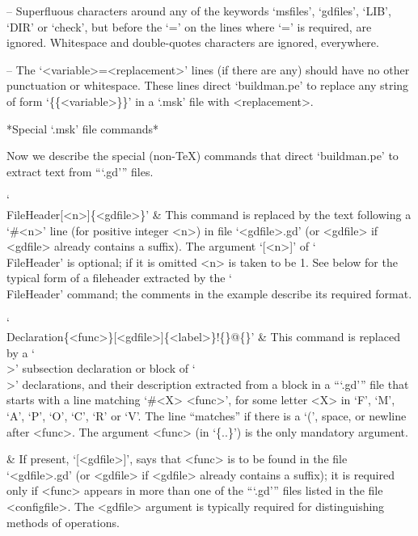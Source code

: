 \item{--}
Superfluous characters around any of the keywords  `msfiles',  `gdfiles',
`LIB', `DIR' or `check', but before the `=' on the  lines  where  `='  is
required,  are  ignored.  Whitespace  and  double-quotes  characters  are
ignored, everywhere.

\item{--}
The `<variable>=<replacement>' lines (if there are any)  should  have  no
other punctuation or whitespace.  These  lines  direct  `buildman.pe'  to
replace any string of form `\{\{<variable>\}\}' in  a  `.msk'  file  with
<replacement>.

\endlist

*Special `.msk' file commands*

Now  we  describe  the  special   (non-{\TeX})   commands   that   direct
`buildman.pe' to extract text from ```.gd''' files.

\beginitems

`\\FileHeader[<n>]\{<gdfile>\}' &
This command is replaced by  the  text  following  a  `\#<n>'  line  (for
positive integer <n>) in file  `<gdfile>.gd'  (or  <gdfile>  if  <gdfile>
already contains a suffix). The argument  `[<n>]'  of  `\\FileHeader'  is
optional; if it is omitted <n> is taken  to  be  1.  See  below  for  the
typical form of a fileheader extracted by the `\\FileHeader' command; the
comments in the example describe its required format.

`\\Declaration\{<func>\}[<gdfile>]\{<label>\}!\{<sub-entry>\}@\{<index-entry>\}' &
This command is replaced by a `\\>' subsection declaration  or  block  of
`\\>' declarations, and their description extracted from  a  block  in  a
```.gd''' file that starts with a line matching `\#<X> <func>', for  some
letter <X> in `F', `M',  `A',  `P',  `O',  `C',  `R'  or  `V'.  The  line
``matches'' if there is a  `(',  space,  or  newline  after  <func>.  The
argument <func> (in `\{..\}') is the only mandatory argument.

&
If present, `[<gdfile>]', says that <func> is to be  found  in  the  file
`<gdfile>.gd' (or <gdfile> if <gdfile> already contains a suffix); it  is
required only if <func> appears in more than one of the  ```.gd'''  files
listed in the file  <configfile>.  The  <gdfile>  argument  is  typically
required for distinguishing methods of operations.

